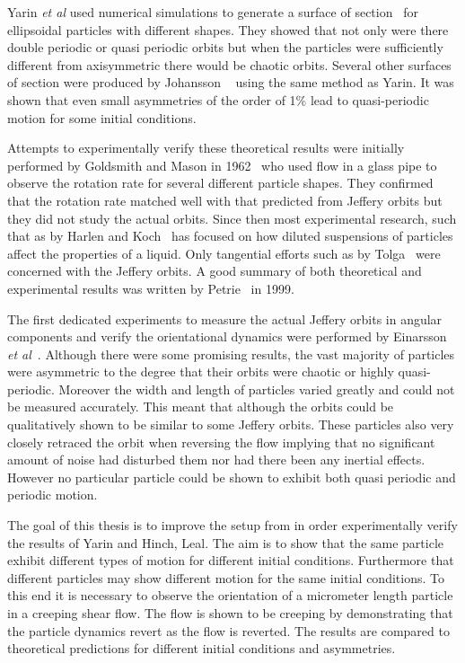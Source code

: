 Yarin \emph{et al} used numerical simulations to generate a surface of section~\cite{SurfaceOfSection} for ellipsoidal particles with different shapes. They showed that not only were there double periodic or quasi periodic orbits but when the particles were sufficiently different from axisymmetric there would be chaotic orbits. 
Several other surfaces of section were produced by Johansson ~\cite{AntonThesis} using the same method as Yarin. It was shown that even small asymmetries of the order of 1\% lead to quasi-periodic motion for some initial conditions.

Attempts to experimentally verify these theoretical results were initially performed by Goldsmith and Mason in 1962~\cite{Mason} who used flow in a glass pipe to observe the rotation rate for several different particle shapes. They confirmed that the rotation rate matched well with that predicted from Jeffery orbits but they did not study the actual orbits. Since then most experimental research, such that as by Harlen and Koch~\cite{fibersspension} has focused on how diluted suspensions of particles affect the properties of a liquid. Only tangential efforts such as by Tolga~\cite{Tolga} were concerned with the Jeffery orbits. A good summary of both theoretical and experimental results was written by Petrie~\cite{Petrie} in 1999.

The first dedicated experiments to measure the actual Jeffery orbits in angular components and verify the orientational dynamics were performed by Einarsson \emph{et al}~\cite{JonasExperiment}. Although there were some promising results, the vast majority of particles were asymmetric to the degree that their orbits were chaotic or highly quasi-periodic. Moreover the width and length of particles varied greatly and could not be measured accurately.
This meant that although the orbits could be qualitatively shown to be similar to some Jeffery orbits. These particles also very closely retraced the orbit when reversing the flow implying that no significant amount of noise had disturbed them nor had there been any inertial effects. However no particular particle could be shown to exhibit both quasi periodic and periodic motion. 

The goal of this thesis is to improve the setup from \cite{AntonThesis} in order experimentally verify the results of Yarin and Hinch, Leal\cite{Yarin, Leal}. The aim is to show that the same particle exhibit different types of motion for different initial conditions. Furthermore that different particles may show different motion for the same initial conditions. To this end it is necessary to observe the orientation of a micrometer length particle in a creeping shear flow. The flow is shown to be creeping by demonstrating that the particle dynamics revert as the flow is reverted. The results are compared to theoretical predictions for different initial conditions and asymmetries.

